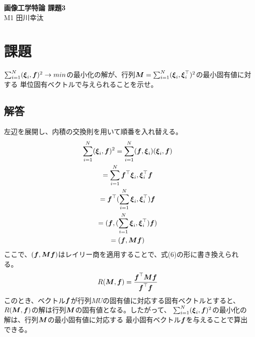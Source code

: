 \documentclass[]{jarticle}          %
\begin{document}

\vspace*{2ex}
\begin{center}
 {\Large \bf 画像工学特論 課題3}\\ %
 \vspace*{5mm}
 {\large M1 田川幸汰}%
\end{center}



\section{課題}
$\sum^N_{i=1}(\boldsymbol{\xi}_i,\mbox{\boldmath $f$})^2\rightarrow min$の最小化の解が、行列$\mbox{\boldmath $M$}=\sum^N_{i=1}(\boldsymbol{\xi}_i,\boldsymbol{\xi}_i^\top)^2$の最小固有値に対する
単位固有ベクトルで与えられることを示せ。
\subsection{解答}
左辺を展開し、内積の交換則を用いて順番を入れ替える。
\begin{gather}
  \sum^N_{i=1}(\boldsymbol{\xi}_i,\mbox{\boldmath $f$})^2=\sum^N_{i=1}(\mbox{\boldmath $f$},\boldsymbol{\xi}_i)(\boldsymbol{\xi}_i,\mbox{\boldmath $f$}) \\
  =\sum^N_{i=1}\mbox{\boldmath $f$}^\top\boldsymbol{\xi}_i,\boldsymbol{\xi}_i^\top\mbox{\boldmath $f$} \\
  =\mbox{\boldmath $f$}^\top(\sum^N_{i=1}\boldsymbol{\xi}_i,\boldsymbol{\xi}_i^\top)\mbox{\boldmath $f$} \\
  =(\mbox{\boldmath $f$},(\sum^N_{i=1}\boldsymbol{\xi}_i,\boldsymbol{\xi}_i^\top)\mbox{\boldmath $f$}) \\
  =(\mbox{\boldmath $f$},\mbox{\boldmath $M$}\mbox{\boldmath $f$})
\end{gather}
ここで、$(\mbox{\boldmath $f$},\mbox{\boldmath $M$}\mbox{\boldmath $f$})$はレイリー商を適用することで、式(6)の形に書き換えられる。
\begin{equation}
  R(\mbox{\boldmath $M$},\mbox{\boldmath $f$})=\frac{\mbox{\boldmath $f$}^\top\mbox{\boldmath $M$}\mbox{\boldmath $f$}}{\mbox{\boldmath $f$}^\top\mbox{\boldmath $f$}}
\end{equation}
このとき、ベクトル$\mbox{\boldmath $f$}$が行列$MU$の固有値に対応する固有ベクトルとすると、
$R(\mbox{\boldmath $M$},\mbox{\boldmath $f$})$の解は行列$\mbox{\boldmath $M$}$の固有値となる。したがって、
$\sum^N_{i=1}(\boldsymbol{\xi}_i,\mbox{\boldmath $f$})^2$の最小化の解は、行列$\mbox{\boldmath $M$}$の最小固有値に対応する
最小固有ベクトル$\mbox{\boldmath $f$}$を与えることで算出できる。
\end{document}
